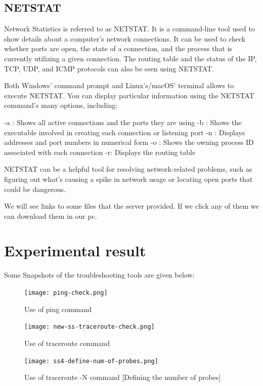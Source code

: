 \documentclass[11pt]{article}
\begin{document}
\subsection{NETSTAT}
Network Statistics is referred to as NETSTAT. It is a command-line tool used to show details about a computer's network connections. It can be used to check whether ports are open, the state of a connection, and the process that is currently utilizing a given connection. The routing table and the status of the IP, TCP, UDP, and ICMP protocols can also be seen using NETSTAT.

Both Windows' command prompt and Linux's/macOS' terminal allows to execute NETSTAT. You can display particular information using the NETSTAT command's many options, including:

-a : Shows all active connections and the ports they are using
-b : Shows the executable involved in creating each connection or listening port
-n : Displays addresses and port numbers in numerical form
-o : Shows the owning process ID associated with each connection
-r: Displays the routing table

NETSTAT can be a helpful tool for resolving network-related problems, such as figuring out what's causing a spike in network usage or locating open ports that could be dangerous.

We will see links to some files that the server provided. If we click any of them we can download them in our pc.

\section{Experimental result}

Some Snapshots of the troubleshooting tools are given below:
\newpage
\begin{figure}[!h]
	\centering
	\texttt{[image: ping-check.png]}
	\caption{Use of ping command}
\end{figure}


\begin{figure}[!h]
	\centering
	\texttt{[image: new-ss-traceroute-check.png]}
	\caption{Use of traceroute command}
\end{figure}

\newpage
\begin{figure}[!h]
	\centering
	\texttt{[image: ss4-define-num-of-probes.png]}
	\caption{Use of traceroute -N command [Defining the number of probes]}
\end{figure}
\end{document}
